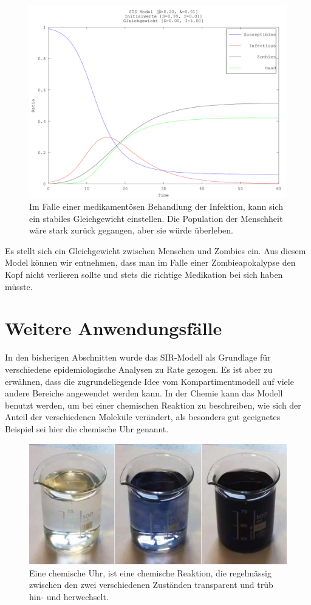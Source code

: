 \begin{refsection}
\[\begin{array}{rccrcrcrcrcrcr}
 \end{array}
\]
\begin{figure}[h]
	\centering
	\includegraphics[width=1\textwidth]{sir/images/Zombies}
  \caption[Zombies]{Im Falle einer medikamentösen Behandlung der Infektion, kann sich ein stabiles Gleichgewicht einstellen. Die Population der Menschheit wäre stark zurück gegangen, aber sie würde überleben.}
\end{figure}

Es stellt sich ein Gleichgewicht zwischen Menschen und Zombies ein. Aus diesem Model können wir entnehmen, dass man im Falle einer Zombieapokalypse den Kopf nicht verlieren sollte und stets die richtige Medikation bei sich haben müsste.

\section{Weitere Anwendungsfälle}
In den bisherigen Abschnitten wurde das SIR-Modell als Grundlage für verschiedene epidemiologische Analysen zu Rate gezogen.
Es ist aber zu erwähnen, dass die zugrundeliegende Idee vom Kompartimentmodell auf viele andere Bereiche angewendet werden kann.
In der Chemie kann das Modell benutzt werden, um bei einer chemischen Reaktion zu beschreiben, wie sich der Anteil der verschiedenen Moleküle verändert, als besonders gut geeignetes Beispiel sei hier die chemische Uhr genannt.
\begin{figure}[h]
	\centering
	\includegraphics[width=.8\textwidth]{sir/images/chemical_clock}
  \caption[Chemische Uhr]{Eine chemische Uhr, ist eine chemische Reaktion, die regelmässig zwischen den zwei verschiedenen Zuständen transparent und trüb hin- und herwechselt.\cite{sir:chemical_clock}}
\end{figure}


\end{refsection}
